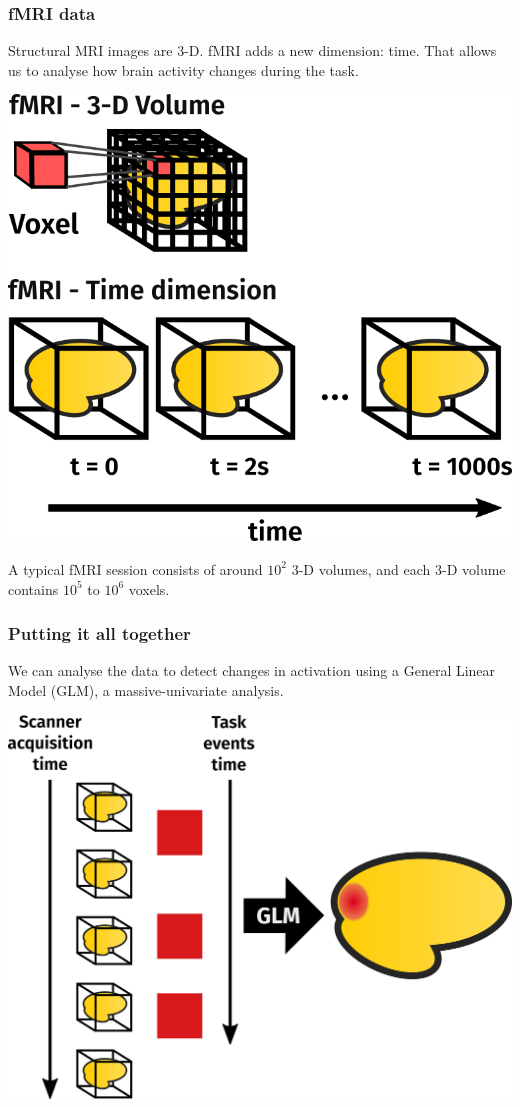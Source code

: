 \documentclass[11pt]{beamer}
\begin{document}
\begin{frame}
    \frametitle{fMRI data}

    Structural MRI images are 3-D. fMRI adds a new dimension: time. That
    allows us to analyse how brain activity changes during the task.

    \begin{center}
        \includegraphics[scale=0.25]{figures/4d_data.png}
    \end{center}

    A typical fMRI session consists of around $10^2$ 3-D volumes, and each 3-D
    volume contains $10^5$ to $10^6$ voxels.

\end{frame}
\begin{frame}
    \frametitle{Putting it all together}
    
    We can analyse the data to detect changes in activation using a General
    Linear Model (GLM), a massive-univariate analysis.

    \begin{center}
        \includegraphics[scale=0.15]{figures/glm.png}
    \end{center}

\end{frame}
\end{document}
